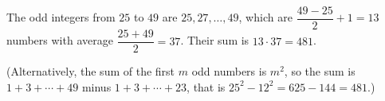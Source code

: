 The odd integers from $25$ to $49$ are $25,27,\dots,49$, which are $\dfrac{49-25}{2}+1=13$ numbers with average $\dfrac{25+49}{2}=37$. Their sum is $13\cdot37=\boxed{481}$.

(Alternatively, the sum of the first $m$ odd numbers is $m^2$, so the sum is $1+3+\cdots+49$ minus $1+3+\cdots+23$, that is $25^2-12^2=625-144=481$.)
